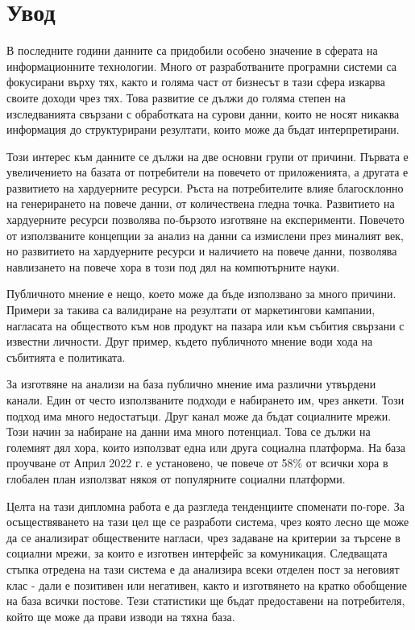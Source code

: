 \documentclass{article}
\begin{document}
    \newpage\tableofcontents

    \newpage


    \section{Увод}

    В последните години данните са придобили особено значение в сферата на информационните технологии. Много от
    разработваните програмни системи са фокусирани върху тях, както и голяма част от бизнесът в тази сфера изкарва своите
    доходи чрез тях. Това развитие се дължи до голяма степен на изследванията свързани с обработката на сурови данни,
    които не носят никаква информация до структурирани резултати, които може да бъдат интерпретирани.

    Този интерес към данните се дължи на две основни групи от причини. Първата е увеличението на базата от потребители на
    повечето от приложенията, а другата е развитието на хардуерните ресурси. Ръста на потребителите влияе благосклонно на
    генерирането на повече данни, от количествена гледна точка. Развитието на хардуерните ресурси позволява по-бързото
    изготвяне на експерименти. Повечето от използваните концепции за анализ на данни са измислени през миналият век, но
    развитието на хардуерните ресурси и наличието на повече данни, позволява навлизането на повече хора в този под дял на
    компютърните науки.

    Публичното мнение е нещо, което може да бъде използвано за много причини. Примери за такива са валидиране на резултати
    от маркетингови кампании, нагласата на обществото към нов продукт на пазара или към събития свързани с известни
    личности. Друг пример, където публичното мнение води хода на събитията е политиката.

    За изготвяне на анализи на база публично мнение има различни утвърдени канали. Един от често използваните подходи е
    набирането им, чрез анкети. Този подход има много недостатъци. Друг канал може да бъдат социалните мрежи. Този начин за
    набиране на данни има много потенциал. Това се дължи на големият дял хора, които използват една или друга социална
    платформа. На база проучване от Април 2022 г. е установено, че повече от 58\% от всички хора в глобален план използват
    някоя от популярните социални платформи. \cite{social-media-users}

    Целта на тази дипломна работа е да разгледа тенденциите споменати по-горе. За осъществяването на тази цел ще се
    разработи система, чрез която лесно ще може да се анализират обществените нагласи, чрез задаване на критерии за търсене
    в социални мрежи, за които е изготвен интерфейс за комуникация. Следващата стъпка отредена на тази система е да
    анализира всеки отделен пост за неговият клас - дали е позитивен или негативен, както и изготвянето на кратко обобщение
    на база всички постове. Тези статистики ще бъдат предоставени на потребителя, който ще може да прави изводи на тяхна
    база.
\end{document}
